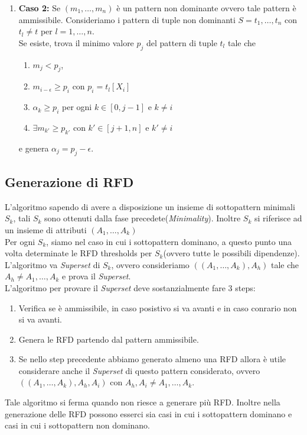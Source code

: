 \begin{itemize}
\begin{enumerate}
				\item  \textbf{Caso 2:} Se $(m_{1},\dots,m_{n})$ è un pattern non dominante ovvero tale pattern è ammissibile.
				Consideriamo i pattern di tuple non dominanti $S=t_{1},\dots,t_{n}$ con $t_{l}\neq t$ per $l=1,\dots,n$.\\
				Se esiste, trova il minimo valore $p_{j}$ del pattern di tuple $t_{l}$ tale che
				\begin{enumerate}
					\item  $m_{j}<p_{j}$, 
					\item $m_{i-\epsilon} \geq p_{i}$ con $p_{i}=t_{l}[X_{i}]$
					\item $\alpha_{k} \geq p_{i}$ per ogni $k \in [0,j-1]$ e $k \neq i$
					\item $\exists m_{k'} \geq p_{k'}$ con $k' \in [j+1,n]$ e $k' \neq i$
				\end{enumerate}  
				e genera $\alpha_{j}= p_{j} -\epsilon$.\\ 
			\end{enumerate}  		
\end{itemize}

\subsection{Generazione di RFD}
L'algoritmo sapendo di avere a disposizione un insieme di sottopattern minimali $S_{k}$, tali $S_{k}$ sono ottenuti dalla fase precedete(\textit{Minimality}). Inoltre $S_{k}$ si riferisce ad un insieme di attributi $(A_{1},\dots,A_{k})$ \\
Per ogni $S_{k}$, siamo nel caso in cui i sottopattern dominano, a questo punto una volta determinate le RFD thresholds per $S_{k}$(ovvero tutte le possibili dipendenze). L'algoritmo va \textit{Superset} di $S_{k}$, ovvero consideriamo $((A_{1},\dots,A_{k}),A_{h})$ tale che $A_{h} \neq A_{1},\dots,A_{k}$ e prova il \textit{Superset}.\\ 
L'algoritmo per provare il \textit{Superset} deve sostanzialmente fare 3 steps:
\begin{enumerate}
	\item Verifica se è ammissibile, in caso posistivo si va avanti e in caso conrario non si va avanti.
	\item Genera le RFD partendo dal pattern ammissibile. 
	\item Se nello step precedente abbiamo generato almeno una RFD  allora è utile considerare anche il \textit{Superset} di questo pattern considerato, ovvero $((A_{1},\dots,A_{k}),A_{h},A_{i})$ con $A_{h},A_{i} \neq A_{1},\dots,A_{k}$.
\end{enumerate}
Tale algoritmo si ferma quando non riesce a generare più RFD. Inoltre nella generazione delle RFD possono esserci sia casi in cui i sottopattern dominano e casi in cui i sottopattern non dominano.
